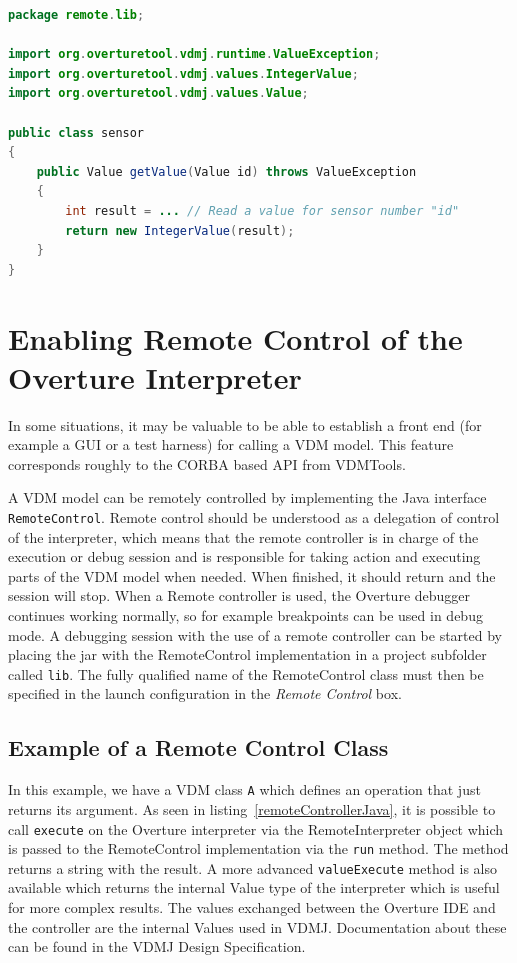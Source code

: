 \documentclass{overturerepchap}
\begin{document}
\begin{lstlisting}[language=JAVA,label=remoteSensorJava,caption=Remote sensor Java class,captionpos=b]
package remote.lib;

import org.overturetool.vdmj.runtime.ValueException;
import org.overturetool.vdmj.values.IntegerValue;
import org.overturetool.vdmj.values.Value;

public class sensor
{
	public Value getValue(Value id) throws ValueException
	{
		int result = ... // Read a value for sensor number "id"
		return new IntegerValue(result);
	}
}
\end{lstlisting}
\newpage
\section{Enabling Remote Control of the Overture Interpreter}\label{sec:remote}

In some situations, it may be valuable to be able to establish a
front end (for example a GUI or a test harness) for calling a VDM model.
This feature corresponds roughly to the CORBA based API from VDMTools\cite{APIMan}.

A VDM model can be remotely controlled by implementing the Java interface \texttt{RemoteControl}. Remote control should be understood as a delegation of control of the interpreter, which means that the remote controller is in charge of the execution or debug session and is responsible for taking action and executing parts of the VDM model when needed. When finished, it should return and the session will stop. When a Remote controller is used, the Overture debugger continues working normally, so for example breakpoints can be used in debug mode. A debugging session with the use of a remote controller can be started by placing the  jar with the RemoteControl implementation in a project subfolder called \texttt{lib}. The fully qualified name of the RemoteControl class must then be specified in the launch configuration in the \textit{Remote Control} box.

\subsection{Example of a Remote Control Class}
In this example, we have a VDM class \texttt{A} which defines an operation
that just returns its argument. As
seen in listing~\ref{remoteControllerJava}, it is possible to call
\texttt{execute} on the Overture interpreter via the RemoteInterpreter object
which is passed to the RemoteControl implementation via the \texttt{run} method.
The method returns a string with the result. A more
advanced \texttt{valueExecute} method is also available which returns the internal
Value type of the interpreter which is useful for more complex
results. The values exchanged between the Overture IDE and the 
controller are the internal Values used in VDMJ. Documentation about these
can be found in the VDMJ Design Specification\cite{Battle10}.
\end{document}
